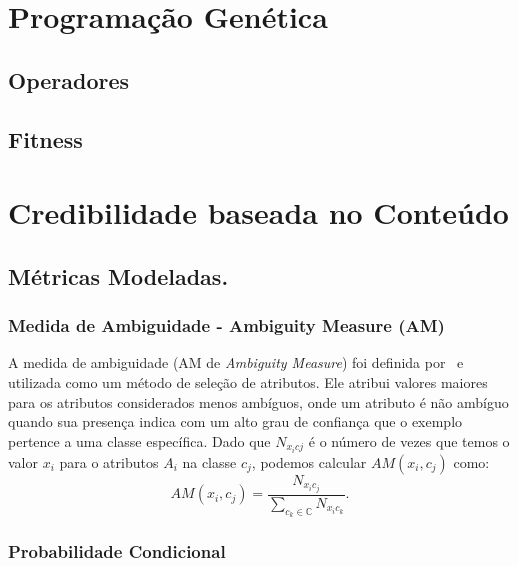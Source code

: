 
\section{Programação Genética}

\subsection{Operadores}

\subsection{Fitness}


\section{Credibilidade baseada no Conteúdo}
\label{sec::pg_cred_baseada_conteudo}

\subsection{Métricas Modeladas.}
\label{subsec::pg_metricas_conteudo}


\subsubsection{Medida de Ambiguidade - Ambiguity Measure (AM)}
\label{subsubsection::am}

A medida de ambiguidade (AM de \textit{Ambiguity Measure}) foi definida por~\cite{Mengle08} e utilizada como um método de seleção de atributos. Ele atribui valores maiores para os atributos considerados menos ambíguos, onde um atributo é não ambíguo quando sua presença indica com um alto grau de confiança que o exemplo pertence a uma classe específica. Dado que $N_{x_{i}c{j}}$ é o número de vezes que temos o valor $x_i$ para o atributos $A_i$ na classe $c_j$, podemos calcular $AM(x_i, c_j)$ como:
\begin{equation}\label{eqn::am}
   AM(x_i, c_j) = \frac{ N_{x_{i}c_{j}}}{\sum\limits_{c_k \in \mathbb{C}} N_{x_{i}c_{k}}}.
\end{equation}

\subsubsection{Probabilidade Condicional}
\label{subsubsection::pc}

